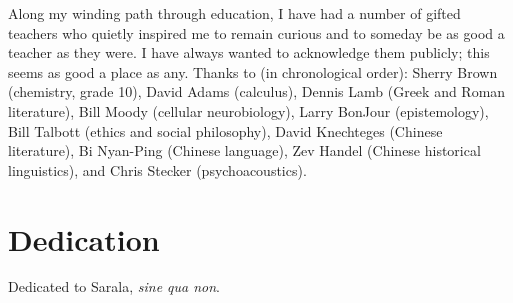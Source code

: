 \begin{spacing}{2}
Along my winding path through education, I have had a number of gifted teachers who quietly inspired me to remain curious and to someday be as good a teacher as they were.  I have always wanted to acknowledge them publicly; this seems as good a place as any.  Thanks to (in chronological order): Sherry Brown (chemistry, grade 10), David Adams (calculus), Dennis Lamb (Greek and Roman literature), Bill Moody (cellular neurobiology), Larry BonJour (epistemology), Bill Talbott (ethics and social philosophy), David Knechteges (Chinese literature), Bi Nyan-Ping (Chinese language), Zev Handel (Chinese historical linguistics), and Chris Stecker (psychoacoustics).
\newpage

\chapter*{Dedication}
Dedicated to Sarala, \textit{sine qua non}.
\end{spacing}
